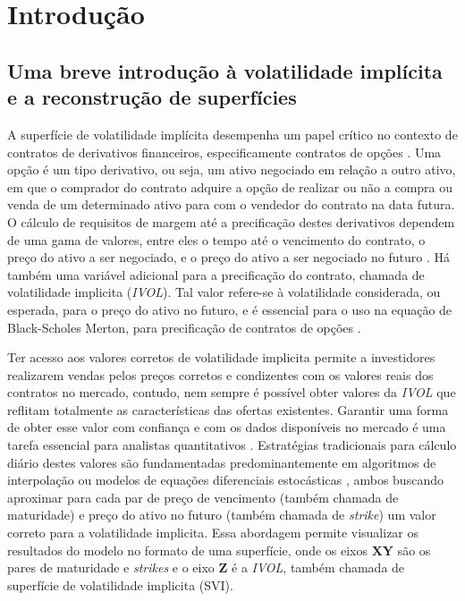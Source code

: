 \section{Introdução}
\subsection{Uma breve introdução à volatilidade implícita e a reconstrução de superfícies}
A superfície de volatilidade implícita desempenha um papel crítico no contexto de contratos de derivativos financeiros, especificamente contratos de opções \citep{Ludkovski2023}. Uma opção é um tipo derivativo, ou seja, um ativo negociado em relação a outro ativo, em que o comprador do contrato adquire a opção de realizar ou não a compra ou venda de um determinado ativo para com o vendedor do contrato na data futura. O cálculo de requisitos de margem até a precificação destes derivativos dependem de uma gama de valores, entre eles o tempo até o vencimento do contrato, o preço do ativo a ser negociado, e o preço do ativo a ser negociado no futuro \citep{Black1973}. Há também uma variável adicional para a precificação do contrato, chamada de volatilidade implicita (\textit{IVOL}). Tal valor refere-se à volatilidade considerada, ou esperada, para o preço do ativo no futuro, e é essencial para o uso na equação de Black-Scholes Merton, para precificação de contratos de opções \citep{Merton1973}. 

Ter acesso aos valores corretos de volatilidade implicita permite a investidores realizarem vendas pelos preços corretos e condizentes com os valores reais dos contratos no mercado, contudo, nem sempre é possível obter valores da \textit{IVOL} que reflitam totalmente as características das ofertas existentes. Garantir uma forma de obter esse valor com confiança e com os dados disponíveis no mercado é uma tarefa essencial para analistas quantitativos \citep{Kim2006}. Estratégias tradicionais para cálculo diário destes valores são fundamentadas predominantemente em algoritmos de interpolação \citep{Homescu2011} ou modelos de equações diferenciais estocásticas \citep{Jordan2011}, ambos buscando aproximar para cada par de preço de vencimento (também chamada de maturidade) e preço do ativo no futuro (também chamada de \textit{strike}) um valor correto para a volatilidade implicita. Essa abordagem permite visualizar os resultados do modelo no formato de uma superfície, onde os eixos \textbf{XY} são os pares de maturidade e \textit{strikes} e o eixo \textbf{Z} é a \textit{IVOL}, também chamada de superfície de volatilidade implicita (SVI). 

